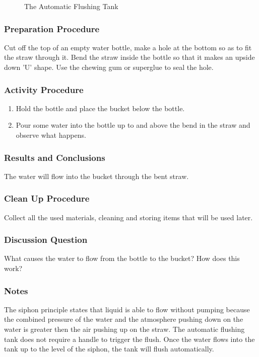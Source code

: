 \begin{figure}
\begin{center}
\def\svgwidth{100pt}

\caption{The Automatic Flushing Tank}
\label{fig:auto-flushing-tank}
\end{center}
\end{figure}

\subsubsection*{Preparation Procedure}
Cut off the top of an empty water bottle, make a hole at the bottom so as to fit the straw through it. 
Bend the straw inside the bottle so that it makes an upside down 'U' shape. Use the chewing gum or superglue to seal the hole.

\subsubsection*{Activity Procedure}
\begin{enumerate}
\item{Hold the bottle and place the bucket below the bottle.} 
\item{Pour some water into the bottle up to and above the bend in the straw and observe what happens.} 
\end{enumerate}

\subsubsection*{Results and Conclusions}
The water will flow into the bucket through the bent straw. 

\subsubsection*{Clean Up Procedure}
Collect all the used materials, cleaning and storing items that will be used later.

\subsubsection*{Discussion Question}
What causes the water to flow from the bottle to the bucket? How does this work?

\subsubsection*{Notes}
The siphon principle states that liquid is able to flow without pumping because the combined pressure of the water and the atmosphere pushing down on the water is greater then the air pushing up on the straw. The automatic flushing tank does not require a handle to trigger the flush. Once the water flows into the tank up to the level of the siphon, the tank will flush automatically. 
	
